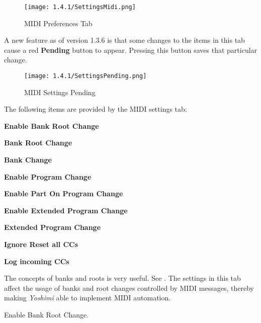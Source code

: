 \begin{figure}[H]
   \centering 
   \texttt{[image: 1.4.1/SettingsMidi.png]}
   \caption[MIDI Preferences]{MIDI Preferences Tab}
   \label{fig:yoshimi_settings_cc}
\end{figure}

   A new feature as of version 1.3.6 is that some changes to the items in this
   tab cause a red \textbf{Pending} button to appear.  Pressing this
   button saves that particular change.

\begin{figure}[H]
   \centering 
   \texttt{[image: 1.4.1/SettingsPending.png]}
   \caption[MIDI Settings Pending]{MIDI Settings Pending}
   \label{fig:yoshimi_settings_pending}
\end{figure}

   The following items are provided by the MIDI settings tab:

   \begin{enumber}
      \item \textbf{Enable Bank Root Change}
      \item \textbf{Bank Root Change}
      \item \textbf{Bank Change}
      \item \textbf{Enable Program Change}
      \item \textbf{Enable Part On Program Change}
      \item \textbf{Enable Extended Program Change}
      \item \textbf{Extended Program Change}
      \item \textbf{Ignore Reset all CCs}
      \item \textbf{Log incoming CCs}
   \end{enumber}

   \setcounter{ItemCounter}{0}      %

   The concepts of banks and roots is very useful.
   See .
   The settings in this tab affect the usage of banks and root changes
   controlled by MIDI messages, thereby making \textsl{Yoshimi} able to
   implement MIDI automation.

   Enable Bank Root Change.

